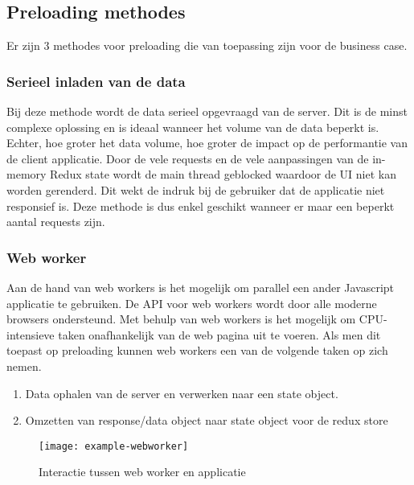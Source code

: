 \subsection{Preloading methodes}
Er zijn 3 methodes voor preloading die van toepassing zijn voor de business case.

\subsubsection{Serieel inladen van de data}
Bij deze methode wordt de data serieel opgevraagd van de server. Dit is de minst complexe oplossing en is ideaal wanneer het volume van de data beperkt is. Echter, hoe groter het data volume, hoe groter de impact op de performantie van de client applicatie. Door de vele requests en de vele aanpassingen van de in-memory Redux state wordt de main thread geblocked waardoor de UI niet kan worden gerenderd. Dit wekt de indruk bij de gebruiker dat de applicatie niet responsief is. Deze methode is dus enkel geschikt wanneer er maar een beperkt aantal requests zijn.

\subsubsection{Web worker}
\label{sssec: web-worker}
Aan de hand van web workers is het mogelijk om parallel een ander Javascript applicatie te gebruiken. De API voor web workers wordt door alle \autocite{web-worker-support} moderne browsers ondersteund. Met behulp van web workers is het mogelijk om CPU-intensieve taken onafhankelijk van de web pagina uit te voeren. Als men dit toepast op preloading kunnen web workers een van de volgende taken op zich nemen.

\begin{enumerate}
\item Data ophalen van de server en verwerken naar een state object.
\item Omzetten van response/data object naar state object voor de redux store
\end{enumerate}

\begin{figure}[h]
\caption{Interactie tussen web worker en applicatie}
\centering
\texttt{[image: example-webworker]}
\end{figure}

